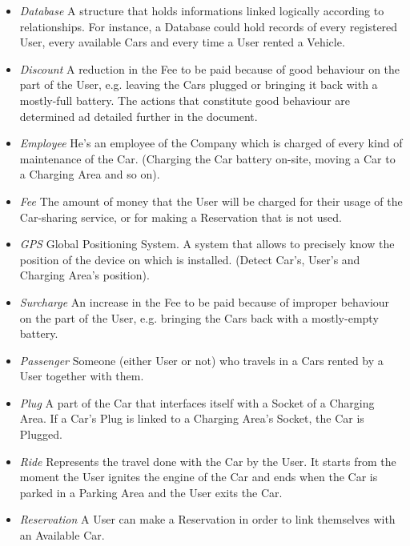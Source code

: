 \begin{itemize}
	\item \emph{Database}
	A structure that holds informations linked logically according to relationships. For instance, a Database could hold records of every registered User, every available Cars and every time a User rented a Vehicle.

	\item \emph{Discount}
	A reduction in the Fee to be paid because of good behaviour on the part of the User, e.g. leaving the Cars plugged or bringing it back with a mostly-full battery. The actions that constitute good behaviour are determined ad detailed further in the document.

	\item \emph{Employee}
	He's an employee of the Company which is charged of every kind of maintenance of the Car. (Charging the Car battery on-site, moving a Car to a Charging Area and so on). 

	\item \emph{Fee}
	The amount of money that the User will be charged for their usage of the Car-sharing service, or for making a Reservation that is not used.

	\item \emph{GPS}
	Global Positioning System. A system that allows to precisely know the position of the device on which is installed. (Detect Car's, User's and Charging Area's position).

	\item \emph{Surcharge}
	An increase in the Fee to be paid because of improper behaviour on the part of the User, e.g. bringing the Cars back with a mostly-empty battery.

	\item \emph{Passenger}
	Someone (either User or not) who travels in a Cars rented by a User together with them.

	\item \emph{Plug}
	A part of the Car that interfaces itself with a Socket of a Charging Area. If a Car's Plug is linked to a Charging Area's Socket, the Car is Plugged.

	\item \emph{Ride}
	Represents the travel done with the Car by the User. It starts from the moment the User ignites the engine of the Car and ends when the Car is parked in a Parking Area and the User exits the Car.

	\item \emph{Reservation}
	A User can make a Reservation in order to link themselves with an Available Car.


\end{itemize}
